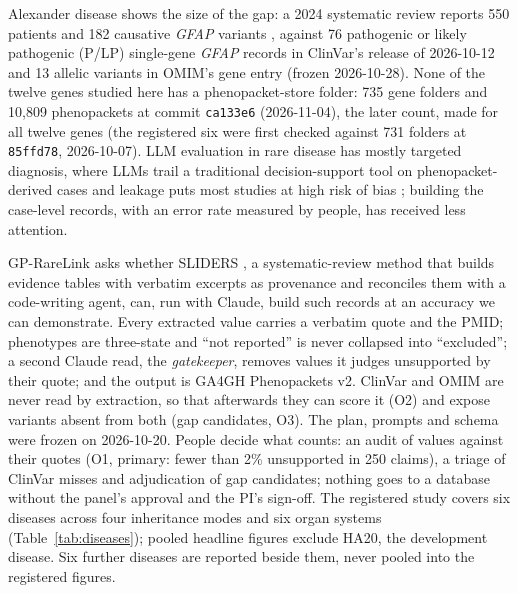 \documentclass{article} %
\begin{document}
Alexander disease shows the size of the gap: a 2024 systematic review reports 550 patients and 182 causative \emph{GFAP} variants \citep{grossi2024_axd_meta}, against 76 pathogenic or likely pathogenic (P/LP) single-gene \emph{GFAP} records in ClinVar's release of 2026-10-12 and 13 allelic variants in OMIM's gene entry (frozen 2026-10-28). None of the twelve genes studied here has a phenopacket-store folder: 735 gene folders and 10,809 phenopackets at commit \texttt{ca133e6} (2026-11-04), the later count, made for all twelve genes (the registered six were first checked against 731 folders at \texttt{85ffd78}, 2026-10-07). LLM evaluation in rare disease has mostly targeted diagnosis, where LLMs trail a traditional decision-support tool on phenopacket-derived cases \citep{reese2026_llm_vs_exomiser} and leakage puts most studies at high risk of bias \citep{nguyen2026_llm_rd_metaanalysis}; building the case-level records, with an error rate measured by people, has received less attention.

GP-RareLink asks whether SLIDERS \citep{joshi2026_sliders}, a systematic-review method that builds evidence tables with verbatim excerpts as provenance and reconciles them with a code-writing agent, can, run with Claude, build such records at an accuracy we can demonstrate. Every extracted value carries a verbatim quote and the PMID; phenotypes are three-state and ``not reported'' is never collapsed into ``excluded''; a second Claude read, the \emph{gatekeeper}, removes values it judges unsupported by their quote; and the output is GA4GH Phenopackets v2. ClinVar and OMIM are never read by extraction, so that afterwards they can score it (O2) and expose variants absent from both (gap candidates, O3). The plan, prompts and schema were frozen on 2026-10-20. People decide what counts: an audit of values against their quotes (O1, primary: fewer than 2\% unsupported in 250 claims), a triage of ClinVar misses and adjudication of gap candidates; nothing goes to a database without the panel's approval and the PI's sign-off. The registered study covers six diseases across four inheritance modes and six organ systems (Table~\ref{tab:diseases}); pooled headline figures exclude HA20, the development disease. Six further diseases are reported beside them, never pooled into the registered figures.
\end{document}
